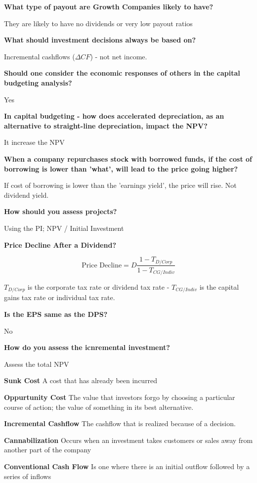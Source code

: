 \documentclass[12pt]{article}
\begin{document}
	\textbf{What type of payout are Growth Companies likely to have?}
	
	They are likely to have no dividends or very low payout ratios

	
	\textbf{What should investment decisions always be based on?}
	
	Incremental cashflows ($\Delta CF$) - not net income.
	
	\textbf{Should one consider the economic responses of others in the capital budgeting analysis?}
	
	Yes
	
	\textbf{In capital budgeting - how does accelerated depreciation, as an alternative to straight-line depreciation, impact the NPV?}
	
	It increase the NPV
	
	\textbf{When a company repurchases stock with borrowed funds, if the cost of borrowing is lower than 'what', will lead to the price going higher?}
	
	If cost of borrowing is lower than the 'earnings yield', the price will rise. Not dividend yield.
	
	\textbf{How should you assess projects?}
	
	Using the PI; NPV / Initial Investment
	
	\textbf{Price Decline After a Dividend?}
	
	$$
	\text{Price Decline} = D \dfrac{1 - T_{D/Corp}}{ 1 - T_{CG/Indiv}}
	$$
	
	$T_{D/Corp}$ is the corporate tax rate or dividend tax rate - $T_{CG/Indiv}$ is the capital gains tax rate or individual tax rate.
	
	\textbf{Is the EPS same as the DPS?}
	
	No 
	
	\textbf{How do you assess the icnremental investment?}
	
	Assess the total NPV
	
	\textbf{Sunk Cost}  A cost that has already been incurred
	
	\textbf{Oppurtunity Cost} The value that investors forgo by choosing a particular course of action; the value of something in its best alternative.
	
	\textbf{Incremental Cashflow} The cashflow that is realized because of a decision. 
	
	\textbf{Cannabilization} Occurs when an investment takes customers or sales away from another part of the company
	
	
	\textbf{Conventional Cash Flow} Is one where there is an initial outflow followed by a series of inflows
	
\end{document}
